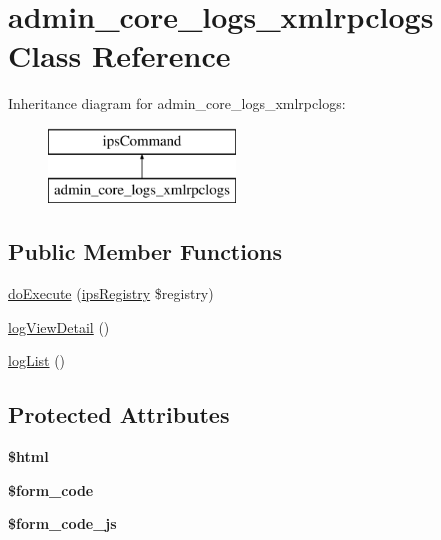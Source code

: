 \hypertarget{classadmin__core__logs__xmlrpclogs}{\section{admin\-\_\-core\-\_\-logs\-\_\-xmlrpclogs Class Reference}
\label{classadmin__core__logs__xmlrpclogs}
}
Inheritance diagram for admin\-\_\-core\-\_\-logs\-\_\-xmlrpclogs\-:\begin{figure}[H]
\begin{center}
\leavevmode
\includegraphics[height=2.000000cm]{classadmin__core__logs__xmlrpclogs}
\end{center}
\end{figure}
\subsection*{Public Member Functions}
\begin{DoxyCompactItemize}
\item 
\hyperlink{classadmin__core__logs__xmlrpclogs_afbc4e912a0604b94d47d66744c64d8ba}{do\-Execute} (\hyperlink{classips_registry}{ips\-Registry} \$registry)
\item 
\hyperlink{classadmin__core__logs__xmlrpclogs_a144c10a9137b991e240b8c239734358d}{log\-View\-Detail} ()
\item 
\hyperlink{classadmin__core__logs__xmlrpclogs_a59c994b78e8416ce48ffdf30268359cb}{log\-List} ()
\end{DoxyCompactItemize}
\subsection*{Protected Attributes}
\begin{DoxyCompactItemize}
\item 
\hypertarget{classadmin__core__logs__xmlrpclogs_a6f96e7fc92441776c9d1cd3386663b40}{{\bfseries \$html}}\label{classadmin__core__logs__xmlrpclogs_a6f96e7fc92441776c9d1cd3386663b40}

\item 
\hypertarget{classadmin__core__logs__xmlrpclogs_af28aee726fa3eb6c355d08a2ab655e03}{{\bfseries \$form\-\_\-code}}\label{classadmin__core__logs__xmlrpclogs_af28aee726fa3eb6c355d08a2ab655e03}

\item 
\hypertarget{classadmin__core__logs__xmlrpclogs_ac68fe8a02a2efd63c3271179f4b4fbb7}{{\bfseries \$form\-\_\-code\-\_\-js}}\label{classadmin__core__logs__xmlrpclogs_ac68fe8a02a2efd63c3271179f4b4fbb7}

\end{DoxyCompactItemize}
